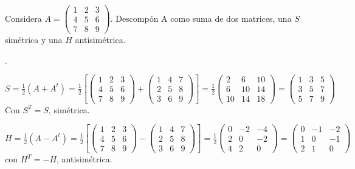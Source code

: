 \begin{ejre}
	Considera $A=\left( \begin{matrix} 1&2&3\\4&5&6\\7&8&9 \end{matrix} \right)$. Descompón A como suma de dos matrices, una $S$ simétrica y una $H$ antisimétrica.
\end{ejre}
\begin{proofw}\renewcommand{\qedsymbol}{$\diamond$}.

$S=\frac 1 2 (A+A^t)= \frac 1 2 \left [\left( \begin{matrix} 1&2&3\\4&5&6\\7&8&9 \end{matrix} \right) + \left( \begin{matrix} 1&4&7\\2&5&8\\3&6&9 \end{matrix} \right) \right] = \frac 1 2  \left( \begin{matrix} 2&6&10\\6&10&14\\10&14&18 \end{matrix} \right) =  \left( \begin{matrix} 1&3&5 \\3&5&7\\5&7&9 \end{matrix} \right)\; $ Con $S^T=S$, simétrica.
 
$H=\frac 1 2 (A-A^t)= \frac 1 2 \left [\left( \begin{matrix} 1&2&3\\4&5&6\\7&8&9 \end{matrix} \right) - \left( \begin{matrix} 1&4&7\\2&5&8\\3&6&9 \end{matrix} \right) \right] =
 \frac 1 2  \left( \begin{matrix} 0&-2&-4\\2&0&-2\\4&2&0 \end{matrix} \right) =  \left( \begin{matrix} 0&-1&-2 \\1&0&-1\\2&1&0 \end{matrix} \right)
\; $ con $H^T=-H$, antisimétrica. 


\end{proofw}
